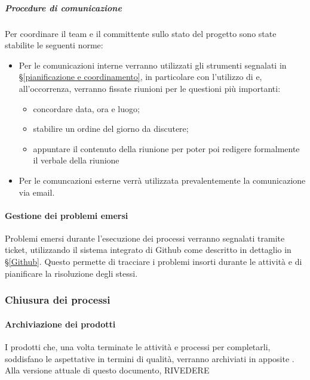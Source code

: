 			\subparagraph{Procedure di comunicazione}
			Per coordinare il team e il committente sullo stato del progetto sono state stabilite le seguenti norme:
			\begin{itemize}
				\item Per le comunicazioni interne verranno utilizzati gli strumenti segnalati in \S\ref{pianificazione e coordinamento}, in particolare
					con l'utilizzo di  e, all'occorrenza, verranno fissate riunioni per le questioni più importanti:
					\begin{itemize}
						\item concordare data, ora e luogo;
						\item stabilire un ordine del giorno da discutere;
						\item appuntare il contenuto della riunione per poter poi redigere formalmente il verbale della riunione
					\end{itemize}
				\item Per le comuncazioni esterne verrà utilizzata prevalentemente la comunicazione via email. %
			\end{itemize}


    		\paragraph{Gestione dei problemi emersi}
			Problemi emersi durante l'esecuzione dei processi verranno segnalati tramite ticket, utilizzando il sistema integrato di Github come descritto
			in dettaglio in \S\ref{Github}. Questo permette di tracciare i problemi insorti durante le attività e di pianificare la risoluzione degli stessi.


		\subsubsection{Chiusura dei processi}

    		\paragraph{Archiviazione dei prodotti} %
			I prodotti che, una volta terminate le attività e processi per completarli, soddisfano le aspettative in termini di qualità,
			verranno archiviati in apposite . Alla versione attuale di questo documento, RIVEDERE

